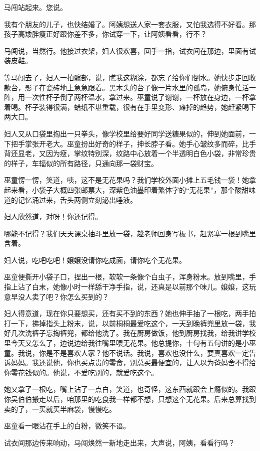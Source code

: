 \documentclass[lang=cn,newtx,12pt,scheme=chinese]{elegantbook}
\begin{document}
马闯站起来。您说。

我有个朋友的儿子，也快结婚了。阿姨想送人家一套衣服，又怕我选得不好看。那孩子高矮胖瘦正好跟你差不多，你试穿一下，让阿姨看看，行不？

马闯说，当然行。他接过衣架，妇人很欢喜，回手一指，试衣间在那边，里面有试装皮鞋。

等马闯去了，妇人一拍髋部，说，瞧我这糊涂，都忘了给你们倒水。她快步走回收款台，影子在瓷砖地上急急跟着。黑木头的台子像一片水里的孤岛，她俯身忙活一阵，用一次性杯子倒了两杯温水，拿过来。巫童说了谢谢，一杯放在身边，一杯拿着喝。杯子装得很满，蜡纸不堪重载，很有在手里变形、瘫掉的趋势，她赶紧喝下两大口。

妇人又从口袋里掏出一只拳头，像学校里给要好同学送糖果似的，伸到她面前，一下把手掌张开老大。巫童扮出好奇的样子，抻长脖子看。她手心皱纹多而碎，比手背还显老，又因为瘦，掌纹特别深，纹路中心放着一个半透明白色小袋，非常珍贵的样子，车辐似的所有路径，只通向那一袋财宝。

巫童愣一愣，笑道，咦，这不是无花果吗？我们学校外面小摊上五毛钱一袋！她拿起来看，小袋子大概四张邮票大，深紫色油墨印着繁体字的“无花果”，那个酸甜味道的记忆涌过来，舌头两侧立刻泌出唾液。

妇人欣然道，对呀！你还记得。

哪能不记得？我们天天课桌抽斗里放一袋，趁老师回身写板书，赶紧塞一根到嘴里含着。

妇人说，吃吧吃吧！嬢嬢没请你吃成面，请你吃个无花果。

巫童便撕开小袋子口，捏出一根，软软一条像个白虫子，浑身粉末。放到嘴里，手指上沾了白末，她像小时一样舔干净手指，说，还真是以前那个味儿。嬢嬢，这玩意早没人卖了吧？你怎么买到的？

妇人得意道，现在你只要想买，还有买不到的东西？她也伸手抽了一根吃，两手拍打一下，拂掉指头上粉末，说，以前桐桐最爱吃这个，一天到晚裤兜里放一袋，我好几次洗裤子忘掏裤兜，都给他洗了。我在厨房做饭，他到厨房找我，给我讲学校里今天又怎么了，边说边给我往嘴里喂无花果。他总提你，十句有五句讲的是小巫童。我说，你是不是喜欢人家？他不说话。我说，喜欢也没什么，要真喜欢一定告诉妈妈。我还说他，你也买点贵的零食，别总买最便宜的，让人以为爸妈舍不得给你零花钱似的。他说，不爱吃别的，就爱吃这个。

她又拿了一根吃，嘴上沾了一点白，笑道，也奇怪，这东西就跟会上瘾似的。我跟你吴伯伯搬走以后，咱那里的吃食我一样都不想，只想这个无花果。后来总算找到卖的了，一买就买半麻袋，慢慢吃。

巫童看一眼沾在手上的白粉，微笑不语。

试衣间那边传来响动，马闯焕然一新地走出来，大声说，阿姨，看看行吗？
\end{document}
